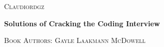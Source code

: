 \newcommand{\HRule}{\rule{\linewidth}{0.2mm}}
\begin{titlepage}
\begin{center}

\begin{LOGOWEBPAGE}

\end{LOGOWEBPAGE}
\begin{navbartext}
	\textsc{Claudiordgz}\\[0.1cm]
\end{navbartext}
\vfill
\begin{navbartext}
	\Large \bfseries Solutions of Cracking the Coding Interview\\[1cm]
\end{navbartext}
\begin{navbartext}
	\textsc{Book Authors: Gayle Laakmann McDowell}\\[0.1cm]
\end{navbartext}

\end{center}
\end{titlepage}